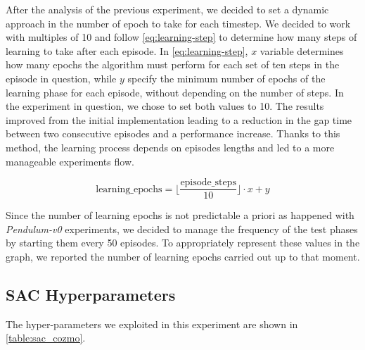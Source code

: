 After the analysis of the previous experiment, we decided to set a dynamic approach in the number of epoch to take for each timestep.
We decided to work with multiples of 10 and follow \vref{eq:learning-step} to determine how many steps of learning to take after each episode.
In \vref{eq:learning-step}, $x$ variable determines how many epochs the algorithm must perform for each set of ten steps in the episode in question, while $y$ specify the minimum number of epochs of the learning phase for each episode, without depending on the number of steps.
In the experiment in question, we chose to set both values to 10.
The results improved from the initial implementation leading to a reduction in the gap time between two consecutive episodes and a performance increase.
Thanks to this method, the learning process depends on episodes lengths and led to a more manageable experiments flow.


\begin{equation}
	\label{eq:learning-step}
	\text{learning\_epochs} = \bigg\lfloor\frac{\text{episode\_steps}}{10}\bigg\rfloor \cdot x + y
\end{equation}

Since the number of learning epochs is not predictable a priori as happened with \textit{Pendulum-v0} experiments, we decided to manage the frequency of the test phases by starting them every 50 episodes. To appropriately represent these values in the graph, we reported the number of learning epochs carried out up to that moment.

\subsection{SAC Hyperparameters}

The hyper-parameters we exploited in this experiment are shown in \vref{table:sac_cozmo}.

